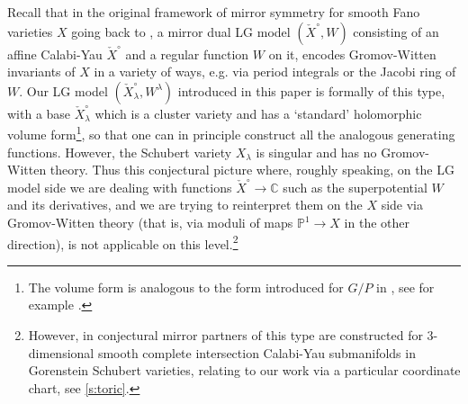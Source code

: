 \documentclass{amsart}
\theoremstyle{definition}
\numberwithin{equation}{section}
\newcommand{\C}{\mathbb{C}}
\begin{document}
Recall that in the original framework of  mirror symmetry for smooth Fano varieties  $X$ 
going back to \cite{Batyrev0,  Givental:ICM, Givental:toricCI, Givental:equivariant, OT, HoriVafa2000}, a mirror dual LG model $(\check X^\circ, W)$ consisting of an affine Calabi-Yau $\check X^\circ$ and a regular function $W$ on it, encodes Gromov-Witten invariants of $X$ in a variety of ways, e.g. via period integrals or the Jacobi ring of $W$.  
Our LG model $(\check X_{\lambda}^\circ,W^\lambda)$ introduced in this paper is formally of this type, with a base $\check X_{\lambda}^\circ$ which is a cluster variety and has a `standard' holomorphic volume form\footnote{The volume form is analogous to the form introduced for $G/P$ in \cite{rietsch}, see for example \cite{LamSp:ClusterCoh}.}, so that  one can in principle construct all the analogous generating functions. 
However, the Schubert variety $X_\lambda$ is singular and has no  Gromov-Witten theory. 
Thus this conjectural picture where, roughly speaking, 
 on the LG model side we are dealing with functions $\check X^\circ\to\C$ such as the 
superpotential  $W$ and its derivatives, and we are trying to reinterpret them on the $X$ side via Gromov-Witten theory  (that is, via moduli of maps 
$\mathbb P^1\to X$
in the other direction), is not applicable on this level.\footnote{However, in \cite{Miura:minuscule} conjectural mirror partners of this type are constructed for $3$-dimensional smooth complete intersection Calabi-Yau submanifolds in Gorenstein Schubert varieties, relating to our work via a particular coordinate chart, see \cref{s:toric}.} 
\end{document}
